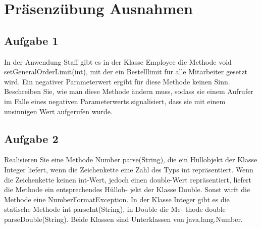 \chapter{Präsenzübung Ausnahmen}

\section{Aufgabe 1}
In der Anwendung Staff gibt es in der Klasse Employee die Methode void setGeneralOrderLimit(int),
mit der ein Bestelllimit für alle Mitarbeiter gesetzt wird. Ein negativer Parameterwert ergibt für diese
Methode keinen Sinn.
Beschreiben Sie, wie man diese Methode ändern muss, sodass sie einem Aufrufer im Falle eines
negativen Parameterwerts signalisiert, dass sie mit einem unsinnigen Wert aufgerufen wurde.

\section{Aufgabe 2}
Realisieren Sie eine Methode Number parse(String), die ein Hüllobjekt der Klasse Integer
liefert, wenn die Zeichenkette eine Zahl des Typs int repräsentiert. Wenn die Zeichenkette keinen
int-Wert, jedoch einen double-Wert repräsentiert, liefert die Methode ein entsprechendes Hüllob-
jekt der Klasse Double. Sonst wirft die Methode eine NumberFormatException.
In der Klasse Integer gibt es die statische Methode int parseInt(String), in Double die Me-
thode double parseDouble(String). Beide Klassen sind Unterklassen von java.lang.Number.
